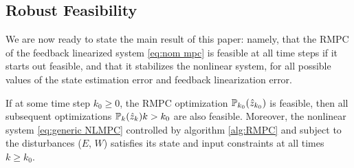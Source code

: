 \subsection{Robust Feasibility}

We are now ready to state the main result of this paper: namely, that the RMPC of the feedback linearized system \eqref{eq:nom mpc} is feasible at all time steps if it starts out feasible, and that it stabilizes the nonlinear system, for all possible values of the state estimation error and feedback linearization error.

\begin{theorem}[Feasibility]
\label{th:robust_feas}
If at some time step $k_0 \geq 0$, the RMPC optimization $\mathbb{P}_{k_0}(\hat{z}_{k_0})$ is feasible, then all subsequent optimizations  $\mathbb{P}_{k}(\hat{z}_{k}) k> k_0$ are also feasible.
Moreover, the nonlinear system \eqref{eq:generic NLMPC} controlled by algorithm \ref{alg:RMPC} and subject to the disturbances ($E$, $W$) satisfies its state and input constraints at all times $k \geq k_0$.
\end{theorem}
